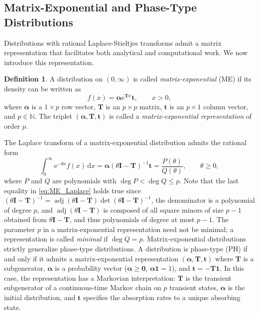 \documentclass[a4paper,11pt]{article}
\numberwithin{equation}{section}
\theoremstyle{plain}
\theoremstyle{definition}
\newtheorem{definition}[theorem]{Definition}
\newcommand{\1}{\mathbf{1}}
\newcommand{\e}{\mathrm{e}}
\newcommand{\dd}{\mathrm{d}}
\begin{document}
\subsection{Matrix-Exponential and Phase-Type Distributions}\label{sectionMEAndPHDns}
Distributions with rational Laplace-Stieltjes transforms admit a matrix representation that facilitates both analytical and computational work. We now introduce this representation.
\begin{definition}
A distribution on $(0,\infty)$ is called \emph{matrix-exponential} (ME) if its density can be written as
\begin{equation}\label{eq:ME_density}
f(x) = \bm{\alpha} \e^{\bm{T}x} \bm{t}, \qquad x > 0,
\end{equation}
where $\bm{\alpha}$ is a $1 \times p$ row vector, $\bm{T}$ is an $p \times p$ matrix, $\bm{t}$ is an $p \times 1$ column vector, and $p\in \mathbb{N}$. 
The triplet $(\bm{\alpha}, \bm{T}, \bm{t})$ is called a \emph{matrix-exponential representation} of order $p$.
\end{definition}
The Laplace transform of a matrix-exponential distribution admits the rational form
\begin{equation}\label{eq:ME_Laplace}
\int_0^\infty \e^{-\theta x} f(x)\,\dd x = \bm{\alpha}(\theta \bm{I} - \bm{T})^{-1}\bm{t} = \frac{P(\theta)}{Q(\theta)}, \qquad \theta\geq 0,
\end{equation}
where $P$ and $Q$ are polynomials with $\deg P < \deg Q \le p$. 
Note that the last equality in \eqref{eq:ME_Laplace} holds true since $(\theta \bm{I} - \bm{T})^{-1}=\operatorname{adj}(\theta \bm{I} - \bm{T})\det(\theta \bm{I} - \bm{T})^{-1}$, the denominator is a polynomial of degree $p$, and $\operatorname{adj}(\theta \bm{I} - \bm{T})$ is composed of all square minors of size $p-1$ obtained from $\theta \bm{I} - \bm{T}$, and thus polynomials of degree at most $p-1$. 
The parameter $p$ in a matrix-exponential representation need not be minimal; a representation is called \emph{minimal} if $\deg Q = p$.
Matrix-exponential distributions strictly generalize phase-type distributions. A distribution is phase-type (PH) if and only if it admits a matrix-exponential representation $(\bm{\alpha}, \bm{T}, \bm{t})$ where $\bm{T}$ is a subgenerator, $\bm{\alpha}$ is a probability vector ($\bm{\alpha} \ge \bm{0}$, $\bm{\alpha}\bm{1} = 1$), and $\bm{t}=-\bm{T}\bm{1}$. In this case, the representation has a Markovian interpretation: $\bm{T}$ is the transient subgenerator of a continuous-time Markov chain on $p$ transient states, $\bm{\alpha}$ is the initial distribution, and $\bm{t}$ specifies the absorption rates to a unique absorbing state.
\end{document}
